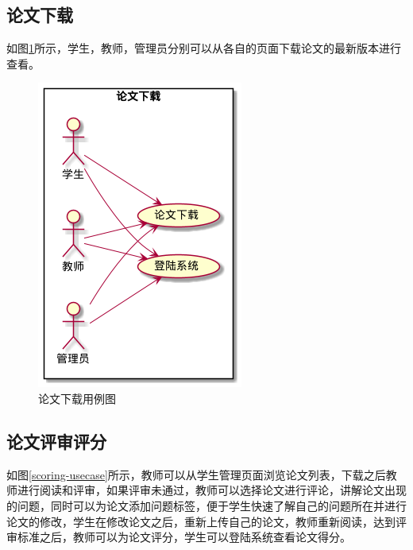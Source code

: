 \subsection{论文下载}

如图\ref{download-usecase}所示，学生，教师，管理员分别可以从各自的页面下载论文的最新版本进行查看。

\begin{figure}[htbp]
	\centering
	\includegraphics[scale = 0.6]{out/uml/用例图/5-论文下载/5-论文下载.png}
	\caption{\song\wuhao 论文下载用例图}
	\label{download-usecase}
\end{figure}

\subsection{论文评审评分}

如图\ref{scoring-usecase}所示，教师可以从学生管理页面浏览论文列表，下载之后教师进行阅读和评审，如果评审未通过，教师可以选择论文进行评论，讲解论文出现的问题，同时可以为论文添加问题标签，便于学生快速了解自己的问题所在并进行论文的修改，学生在修改论文之后，重新上传自己的论文，教师重新阅读，达到评审标准之后，教师可以为论文评分，学生可以登陆系统查看论文得分。

